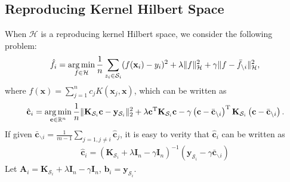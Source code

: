 \documentclass{article}
\newcommand{\argmin}{\operatornamewithlimits{arg\,min}}
\begin{document}
\subsection{Reproducing Kernel Hilbert Space}
When $\mathcal{H}$ is a reproducing kernel Hilbert space,
we consider the following problem:
\begin{align}
\label{opti-RKHS-first}
  \hat{f}_i=
  \argmin_{f\in\mathcal{H}}
  \frac{1}{n}\sum_{z_i\in\mathcal{S}_i}(f(\mathbf x_i)-y_i)^2+\lambda \|f\|_\mathcal{H}^2+\gamma \|f-\bar{f}_{\backslash i}\|_\mathcal{H}^2,
\end{align}
where $f(\mathbf x)=\sum_{j=1}^n c_j K(\mathbf x_j,\mathbf x)$,
which can be written as
\begin{align}
\label{opti-RKHS}
  \hat{\mathbf c}_i=\argmin_{\mathbf c\in\mathbb{R}^n}
  \frac{1}{n}\|\mathbf K_{\mathcal{S}_i}\mathbf c-\mathbf y_{\mathcal{S}_i}\|_2^2+\lambda \mathbf c^\mathrm{T}\mathbf K_{\mathcal{S}_i}\mathbf c
  -\gamma \left(\mathbf c- \bar{\mathbf c}_{\backslash i}\right)^\mathrm{T}
  \mathbf K_{\mathcal{S}_i}\left(\mathbf c- \bar{\mathbf c}_{\backslash i}\right).
\end{align}
If given $\bar{\mathbf c}_{\backslash i}=\frac{1}{m-1}\sum_{j=1,j\not =i}\hat{\mathbf c}_j$,
it is easy to verity that $\hat{\mathbf c}_i$ can be written as
\begin{align*}
  \hat{\mathbf c}_i=\left(\mathbf K_{\mathcal{S}_i}+\lambda \mathbf I_n-\gamma\mathbf I_n\right)^{-1}
  \left(\mathbf y_{\mathcal{S}_i}-\gamma \bar{\mathbf c}_{\backslash i}\right)
\end{align*}
Let $\mathbf A_i=\mathbf K_{\mathcal{S}_i}+\lambda \mathbf I_n-\gamma\mathbf I_n$, $\mathbf b_i=\mathbf y_{\mathcal{S}_i}$.
\end{document}
